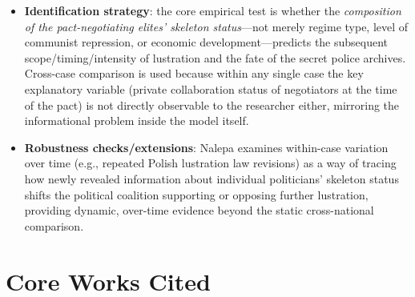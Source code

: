 \documentclass[12pt]{article}
\begin{document}
\begin{itemize}[leftmargin=*, itemsep=4pt]
    \item \textbf{Identification strategy}: the core empirical test is whether the \emph{composition of the pact-negotiating elites' skeleton status}---not merely regime type, level of communist repression, or economic development---predicts the subsequent scope/timing/intensity of lustration and the fate of the secret police archives. Cross-case comparison is used because within any single case the key explanatory variable (private collaboration status of negotiators at the time of the pact) is not directly observable to the researcher either, mirroring the informational problem inside the model itself.
    \item \textbf{Robustness checks/extensions}: Nalepa examines within-case variation over time (e.g., repeated Polish lustration law revisions) as a way of tracing how newly revealed information about individual politicians' skeleton status shifts the political coalition supporting or opposing further lustration, providing dynamic, over-time evidence beyond the static cross-national comparison.
\end{itemize}

\section{Core Works Cited}
\end{document}
